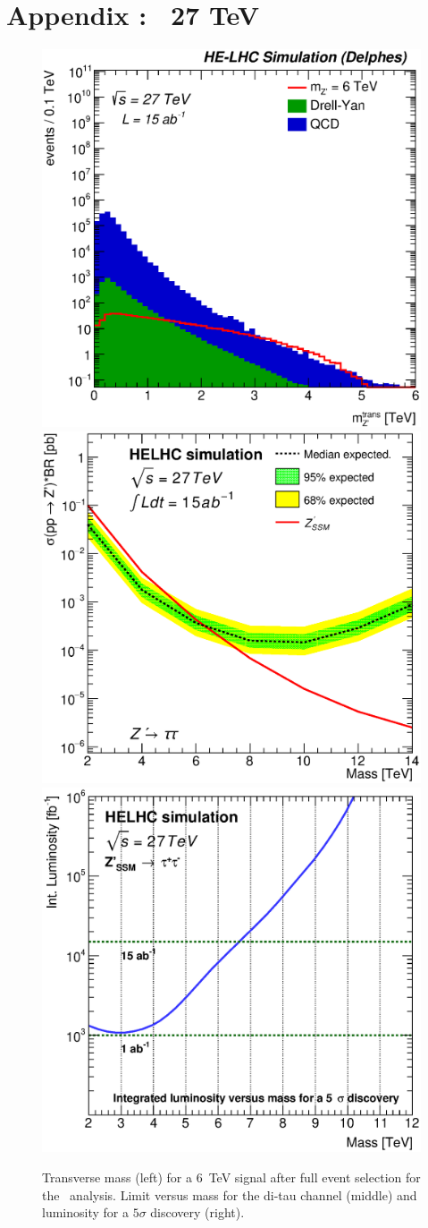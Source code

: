 \clearpage
\newpage

\section{Appendix : \Zptata\  27 TeV}
\label{appendix:zptautau27}

\begin{figure}[!htb]
  \centering
  \includegraphics[width=0.32\columnwidth]{Fig/27tev/Zptautau_mt_sel0_nostack_log.eps}
  \includegraphics[width=0.32\columnwidth]{Fig/27tev/lim_Zprime_tautau_helhc_v01.eps}
  \includegraphics[width=0.32\columnwidth]{Fig/27tev/DiscoveryPotential_tautau_rootStyle.eps}
  \caption{Transverse mass (left) for a 6~TeV signal after full event selection for the \Zptata\ analysis. Limit versus mass for the di-tau channel (middle) and luminosity for a $5\sigma$ discovery (right).}
  \label{figure:leptonicresonances27:tautau}
\end{figure}

